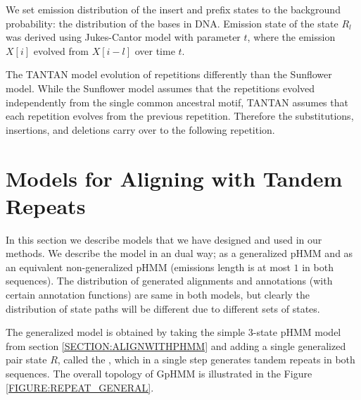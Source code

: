 We set emission distribution of the insert and prefix states to the background
probability: the distribution of the bases in DNA. Emission state of the state
$R_l$ was derived using Jukes-Cantor model with parameter $t$, where the
emission $X[i]$ evolved from $X[i-l]$ over time $t$.

The TANTAN model evolution of repetitions differently than the Sunflower model.
While the Sunflower model assumes that the repetitions evolved independently
from the single common ancestral motif,  TANTAN assumes that each repetition
evolves from the previous repetition. Therefore the substitutions, insertions, and
deletions carry over to the following repetition.

\section{Models for Aligning with Tandem Repeats}\label{SECTION:REPMODELS}

In this section we describe models that we have designed and used in our
methods. We describe the model in an dual way; as a generalized pHMM and as an
equivalent non-generalized pHMM (emissions length is at most $1$ in both
sequences). The distribution of generated alignments and annotations (with
certain annotation functions) are same in both models, but clearly the
distribution of state paths will be different due to different sets of states.

The generalized model is obtained by taking the simple 3-state pHMM model from
section \ref{SECTION:ALIGNWITHPHMM} and adding a single generalized pair state
$R$, called the , which in a single step generates
tandem repeats in both sequences.  The overall topology of GpHMM is illustrated
in the Figure \ref{FIGURE:REPEAT_GENERAL}.

